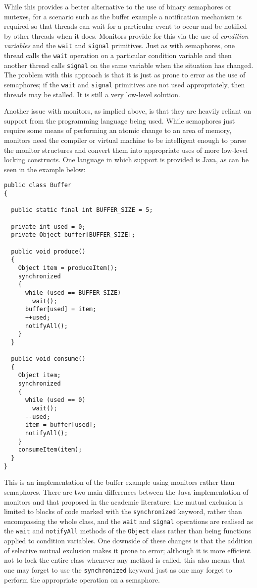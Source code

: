 While this provides a better alternative to the use of binary
semaphores or mutexes, for a scenario such as the buffer example a
notification mechanism is required so that threads can wait for a
particular event to occur and be notified by other threads when it
does.  Monitors provide for this via the use of \emph{condition
  variables} and the \texttt{wait} and \texttt{signal} primitives.
Just as with semaphores, one thread calls the \texttt{wait} operation
on a particular condition variable and then another thread calls
\texttt{signal} on the same variable when the situation has changed.
The problem with this approach is that it is just as prone to error as
the use of semaphores; if the \texttt{wait} and \texttt{signal}
primitives are not used appropriately, then threads may be stalled.
It is still a very low-level solution.

Another issue with monitors, as implied above, is that they are
heavily reliant on support from the programming language being used.
While semaphores just require some means of performing an atomic
change to an area of memory, monitors need the compiler or virtual
machine to be intelligent enough to parse the monitor structures and
convert them into appropriate uses of more low-level locking
constructs.  One language in which support is provided is Java, as can
be seen in the example below:

\begin{verbatim}
public class Buffer
{

  public static final int BUFFER_SIZE = 5;

  private int used = 0;
  private Object buffer[BUFFER_SIZE];
  
  public void produce()
  {
    Object item = produceItem();
    synchronized
    {
      while (used == BUFFER_SIZE)
        wait();
      buffer[used] = item;
      ++used;
      notifyAll();
    }
  }

  public void consume()
  {
    Object item;
    synchronized
    {
      while (used == 0)
        wait();
      --used;
      item = buffer[used];
      notifyAll();
    }
    consumeItem(item);
  }
}
\end{verbatim}

This is an implementation of the buffer example using monitors rather
than semaphores.  There are two main differences between the Java
implementation of monitors and that proposed in the academic
literature: the mutual exclusion is limited to blocks of code marked
with the \texttt{synchronized} keyword, rather than encompassing the
whole class, and the \texttt{wait} and \texttt{signal} operations are
realised as the \texttt{wait} and \texttt{notifyAll} methods of the
\texttt{Object} class rather than being functions applied to condition
variables.  One downside of these changes is that the addition of
selective mutual exclusion makes it prone to error; although it is
more efficient not to lock the entire class whenever any method is
called, this also means that one may forget to use the
\texttt{synchronized} keyword just as one may forget to perform the
appropriate operation on a semaphore.

